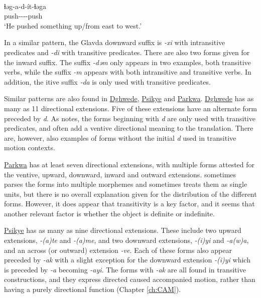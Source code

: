 \ex\label{ex:glav7b}
 \\
\gll ɬəg-a-d-ít-ɬəga \\
push----push \\
\glt `He pushed something up/from east to west.'
\z

In a similar pattern, the Glavda downward suffix is \textit{-xi} with intransitive predicates and \textit{-di} with transitive predicates. There are also two forms given for the inward suffix. The suffix \textit{-dəm} only appears in two examples, both transitive verbs, while the suffix \textit{-m} appears with both intransitive and transitive verbs. In addition, the itive suffix \textit{-da} is only used with transitive predicates. 

Similar patterns are also found in \hyperref[dghw]{Dghwede}, \hyperref[psik]{Psikye} and \hyperref[park]{Parkwa}. \hyperref[dghw]{Dghwede} has as many as 11 directional extensions. Five of these extensions have an alternate form preceded by \textit{d}. As \citet[19]{frickVerbalSystemDghwede1978} notes, the forms beginning with \textit{d} are only used with transitive predicates, and often add a ventive directional meaning to the translation. There are, however, also examples of forms without the initial \textit{d} used in transitive motion contexts. 

\hyperref[park]{Parkwa} has at least seven directional extensions, with multiple forms attested for the ventive, upward, downward, inward and outward extensions.  \citet[89, 92]{jarvisEsquisseGrammaticalePodoko1989} sometimes parses the forms into multiple morphemes and sometimes treats them as single units, but there is no overall explanation given for the distribution of the different forms. However, it does appear that transitivity is a key factor, and it seems that another relevant factor is whether the object is definite or indefinite. 

\hyperref[psik]{Psikye} has as many as nine directional extensions. These include two upward extensions, \textit{-(a)te} and \textit{-(a)me}, and two downward extensions, \textit{-(i)yi} and \textit{-a(w)a}, and an across (or outward) extension \textit{-ve}. Each of these forms also appear preceded by \textit{-ak} with a slight exception for the downward extension \textit{-(i)yi} which is preceded by \textit{-a} becoming \textit{-ayi}. The forms with \textit{-ak} are all found in transitive constructions, and they express directed caused accompanied motion, rather than having a purely directional function (Chapter \ref{ch:CAM}).  %

